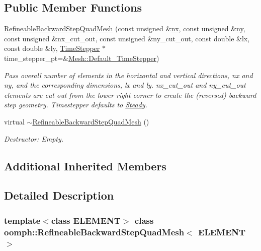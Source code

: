 \subsection*{Public Member Functions}
\begin{DoxyCompactItemize}
\item 
\hyperlink{classoomph_1_1RefineableBackwardStepQuadMesh_a0502cd96a9edc2789f9ddf6ec7b1d2ca}{Refineable\+Backward\+Step\+Quad\+Mesh} (const unsigned \&\hyperlink{classoomph_1_1RectangularQuadMesh_abfef93d6322886cdce14a437186e4821}{nx}, const unsigned \&\hyperlink{classoomph_1_1RectangularQuadMesh_a86d76a55eb7c4e8bca9b74d23c8b0412}{ny}, const unsigned \&nx\+\_\+cut\+\_\+out, const unsigned \&ny\+\_\+cut\+\_\+out, const double \&lx, const double \&ly, \hyperlink{classoomph_1_1TimeStepper}{Time\+Stepper} $\ast$time\+\_\+stepper\+\_\+pt=\&\hyperlink{classoomph_1_1Mesh_a12243d0fee2b1fcee729ee5a4777ea10}{Mesh\+::\+Default\+\_\+\+Time\+Stepper})
\begin{DoxyCompactList}\small\item\em Pass overall number of elements in the horizontal and vertical directions, nx and ny, and the corresponding dimensions, lx and ly. nx\+\_\+cut\+\_\+out and ny\+\_\+cut\+\_\+out elements are cut out from the lower right corner to create the (reversed) backward step geometry. Timestepper defaults to \hyperlink{classoomph_1_1Steady}{Steady}. \end{DoxyCompactList}\item 
virtual \hyperlink{classoomph_1_1RefineableBackwardStepQuadMesh_af30cb7d5ef893e64b184d540ed415e11}{$\sim$\+Refineable\+Backward\+Step\+Quad\+Mesh} ()
\begin{DoxyCompactList}\small\item\em Destructor\+: Empty. \end{DoxyCompactList}\end{DoxyCompactItemize}
\subsection*{Additional Inherited Members}


\subsection{Detailed Description}
\subsubsection*{template$<$class E\+L\+E\+M\+E\+NT$>$\newline
class oomph\+::\+Refineable\+Backward\+Step\+Quad\+Mesh$<$ E\+L\+E\+M\+E\+N\+T $>$}

